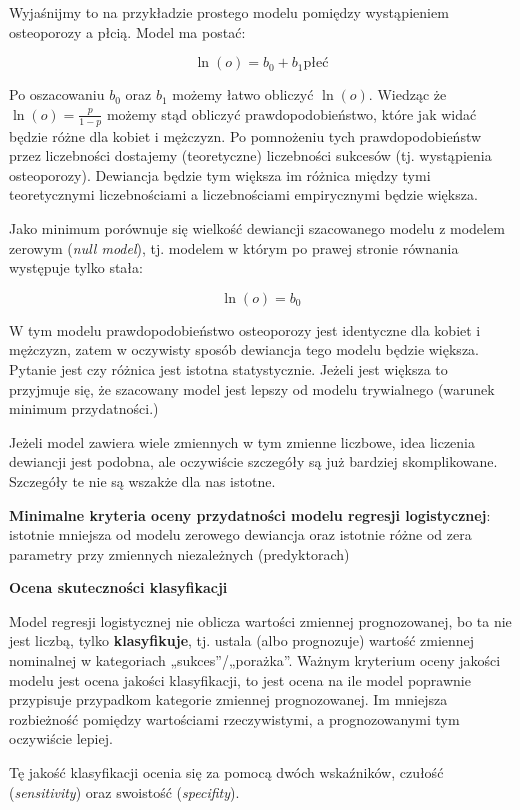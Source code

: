 \documentclass[
  openany]{book}
\begin{document}
Wyjaśnijmy to na przykładzie
prostego modelu pomiędzy wystąpieniem osteoporozy a płcią. Model ma postać:

\[\ln(o) = b_0 + b_1 \textrm{płeć}\]

Po oszacowaniu \(b_0\) oraz \(b_1\) możemy łatwo obliczyć \(\ln(o)\).
Wiedząc że \(\ln(o)=\frac{p}{1-p}\) możemy stąd obliczyć prawdopodobieństwo, które
jak widać będzie różne dla kobiet i mężczyzn.
Po pomnożeniu tych prawdopodobieństw przez liczebności dostajemy
(teoretyczne) liczebności sukcesów (tj. wystąpienia osteoporozy).
Dewiancja będzie tym większa im różnica między tymi
teoretycznymi liczebnościami a liczebnościami empirycznymi będzie większa.

Jako minimum porównuje się wielkość dewiancji szacowanego modelu
z modelem zerowym (\emph{null model}), tj. modelem w którym po prawej stronie
równania występuje tylko stała:

\[\ln(o) = b_0\]

W tym modelu prawdopodobieństwo osteoporozy jest identyczne dla
kobiet i mężczyzn, zatem w oczywisty sposób dewiancja tego modelu
będzie większa. Pytanie jest czy różnica jest istotna statystycznie.
Jeżeli jest większa to przyjmuje się, że szacowany model jest lepszy od modelu
trywialnego (warunek minimum przydatności.)

Jeżeli model zawiera wiele zmiennych w tym zmienne liczbowe, idea
liczenia dewiancji jest podobna, ale oczywiście szczegóły są już bardziej
skomplikowane. Szczegóły te nie są wszakże dla nas istotne.

\textbf{Minimalne kryteria oceny przydatności modelu regresji logistycznej}:
istotnie mniejsza od modelu zerowego dewiancja oraz istotnie różne
od zera parametry przy zmiennych niezależnych (predyktorach)

\textbf{Ocena skuteczności klasyfikacji}

Model regresji logistycznej nie oblicza wartości zmiennej prognozowanej,
bo ta nie jest liczbą, tylko \textbf{klasyfikuje}, tj. ustala (albo prognozuje) wartość
zmiennej nominalnej w kategoriach „sukces''/„porażka''.
Ważnym kryterium oceny jakości modelu jest ocena jakości
klasyfikacji, to jest ocena na ile model poprawnie
przypisuje przypadkom kategorie zmiennej prognozowanej. Im mniejsza
rozbieżność pomiędzy wartościami rzeczywistymi, a prognozowanymi tym oczywiście lepiej.

Tę jakość klasyfikacji ocenia się za pomocą dwóch wskaźników,
czułość (\emph{sensitivity}) oraz swoistość (\emph{specifity}).
\end{document}
